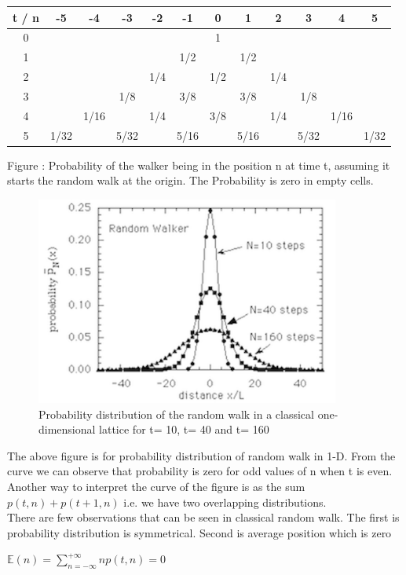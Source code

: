 \documentclass[11 pt]{article}
\theoremstyle{definition}
\theoremstyle{remark}
\begin{document}
\begin{center}
\begin{tabular}{ |c|c|c|c|c|c|c|c|c|c|c|c| } 
 \hline
 t / n   & -5 & -4 & -3 & -2 & -1 & 0 & 1 & 2 & 3 & 4 & 5 \\
 \hline
 0 &  &  &  &  &  & 1 &  &  &  &  &  \\
 \hline
 1 &  &  &  &  & 1/2 &  & 1/2 &  &  &  &  \\
 \hline
 2 &  &  &  & 1/4 &  & 1/2 &  & 1/4 &  &  &  \\
 \hline
 3 &  &  & 1/8 &  & 3/8 &  & 3/8 &  & 1/8 &  &  \\
 \hline
 4 &  & 1/16 &  & 1/4 &  & 3/8 &  & 1/4 &  & 1/16 &  \\
 \hline
 5 & 1/32 &  & 5/32 &  & 5/16 &  & 5/16 &  & 5/32 &  & 1/32 \\
 \hline
\end{tabular}
\end{center}
Figure : Probability of the walker being in the position n at time t, assuming it starts the random walk at the origin. The Probability is zero in empty cells.

\begin{figure}[htp]
\centering
\includegraphics[width=10cm]{Classical_Probability.png}
\caption{Probability distribution of the random walk in a classical one-dimensional lattice for t= 10, t= 40 and t= 160}
\end{figure}
The above figure is for probability distribution of random walk in 1-D. From the curve we can observe that probability is zero for odd values of n when t is even. Another way to interpret the curve of the figure is as the sum $p(t,n) + p(t+1,n) $ i.e. we have two overlapping distributions.\\

There are few observations that can be seen in classical random walk. The first is probability distribution is symmetrical. Second is average position which is zero \\
\begin{center}
    $\mathbb{E}(n) = \sum_{n=-\infty}^{+\infty} np(t,n) = 0$
\end{center}
\end{document}
